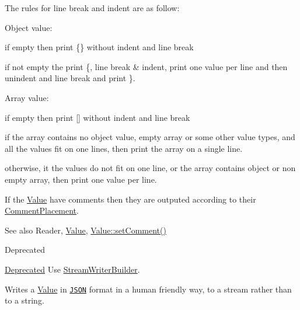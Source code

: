 The rules for line break and indent are as follow\+:
\begin{DoxyItemize}
\item Object value\+:
\begin{DoxyItemize}
\item if empty then print \{\} without indent and line break
\item if not empty the print \textquotesingle{}\{\textquotesingle{}, line break \& indent, print one value per line and then unindent and line break and print \textquotesingle{}\}\textquotesingle{}.
\end{DoxyItemize}
\item Array value\+:
\begin{DoxyItemize}
\item if empty then print \mbox{[}\mbox{]} without indent and line break
\item if the array contains no object value, empty array or some other value types, and all the values fit on one lines, then print the array on a single line.
\item otherwise, it the values do not fit on one line, or the array contains object or non empty array, then print one value per line.
\end{DoxyItemize}
\end{DoxyItemize}

If the \hyperlink{classJson_1_1Value}{Value} have comments then they are outputed according to their \hyperlink{namespaceJson_a4fc417c23905b2ae9e2c47d197a45351_a4fc417c23905b2ae9e2c47d197a45351}{Comment\+Placement}.

\begin{DoxySeeAlso}{See also}
Reader, \hyperlink{classJson_1_1Value}{Value}, \hyperlink{classJson_1_1Value_a29f3a30f7e5d3af6f38d57999bf5b480_a29f3a30f7e5d3af6f38d57999bf5b480}{Value\+::set\+Comment()} 
\end{DoxySeeAlso}
\begin{DoxyRefDesc}{Deprecated}
\item[\hyperlink{deprecated__deprecated000009}{Deprecated}]Use \hyperlink{classJson_1_1StreamWriterBuilder}{Stream\+Writer\+Builder}. \end{DoxyRefDesc}
Writes a \hyperlink{classJson_1_1Value}{Value} in \href{http://www.json.org}{\tt J\+S\+ON} format in a human friendly way, to a stream rather than to a string.

